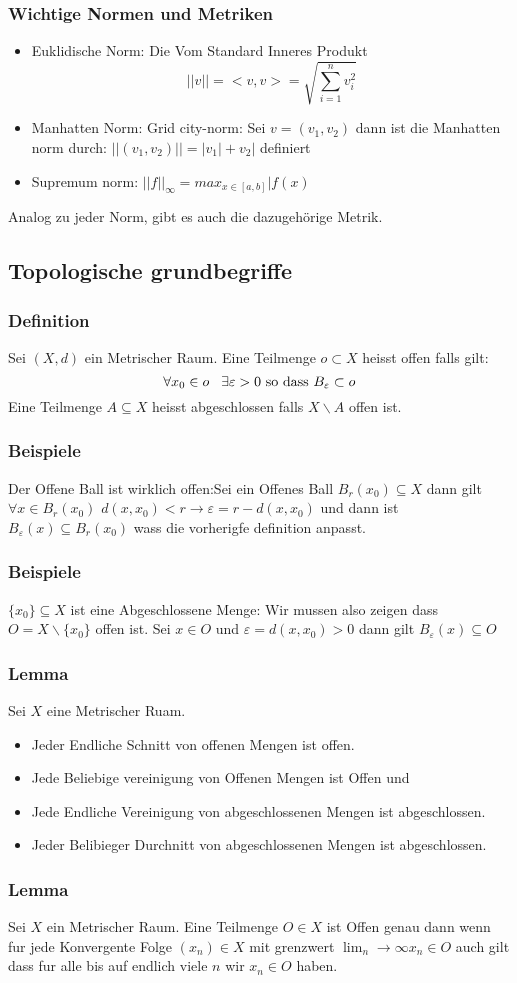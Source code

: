 \documentclass{article}
\newcommand{\smspc}{\hspace{0.3cm}}
\newcommand{\beispiel}[1]{\subsubsection*{Beispiele {#1}}}
\newcommand{\lemma}[1]{\subsubsection*{Lemma {#1}}}
\newcommand{\definition}[1]{\subsubsection*{Definition {#1}}}
\begin{document}
\subsubsection*{Wichtige Normen und Metriken}
\begin{itemize}
  \item{Euklidische Norm: Die Vom Standard Inneres Produkt\[||v||=<v,v>=\sqrt{\sum_{i=1}^n v_i^2}\]}
  \item{Manhatten Norm: Grid city-norm: Sei $v=(v_1,v_2)$ dann ist die Manhatten norm durch: $||(v_1,v_2)||=|v_1|+v_2|$ definiert}
  \item{Supremum norm: $||f||_\infty=max_{x\in[a,b]}|f(x)$}
\end{itemize}
Analog zu jeder Norm, gibt es auch die dazugehörige Metrik.
\subsection{Topologische grundbegriffe}
\definition{} Sei $(X,d)$ ein Metrischer Raum. Eine Teilmenge $o\subset X$ heisst offen falls gilt: \[\forall x_0\in o\smspc \exists \varepsilon >0\text{ so dass } B_\varepsilon \subset o\]Eine Teilmenge $A\subseteq X$ heisst abgeschlossen falls $X\backslash A$ offen ist.
\beispiel{} Der Offene Ball ist wirklich offen:Sei ein Offenes Ball $B_r(x_0)\subseteq X$ dann gilt $\forall x\in B_r(x_0)$ $d(x,x_0)<r\longrightarrow \varepsilon =r-d(x,x_0)$ und dann ist $B_\varepsilon(x)\subseteq B_r(x_0)$ wass die vorherigfe definition anpasst.
\beispiel{} $\lbrace x_0\rbrace\subseteq X$ ist eine Abgeschlossene Menge: Wir mussen also zeigen dass $O=X\backslash \lbrace x_0 \rbrace$ offen ist. Sei $x\in O$ und $\varepsilon = d(x,x_0)>0$ dann gilt $B_\varepsilon(x)\subseteq O$
\lemma{} Sei $X$ eine Metrischer Ruam. \begin{itemize}\item{Jeder Endliche Schnitt von offenen Mengen ist offen.}\item{Jede Beliebige vereinigung von Offenen Mengen ist Offen und} \item{Jede Endliche Vereinigung von abgeschlossenen Mengen ist abgeschlossen.}\item{Jeder Belibieger Durchnitt von abgeschlossenen Mengen ist abgeschlossen.}\end{itemize}
\lemma{} Sei $X$ ein Metrischer Raum. Eine Teilmenge $O\in X$ ist Offen genau dann wenn fur jede Konvergente Folge $(x_n)\in X$ mit grenzwert $\lim_n{\rightarrow \infty} x_n\in O$  auch gilt dass fur alle bis auf endlich viele $n$ wir $x_n\in O$ haben.
\end{document}
